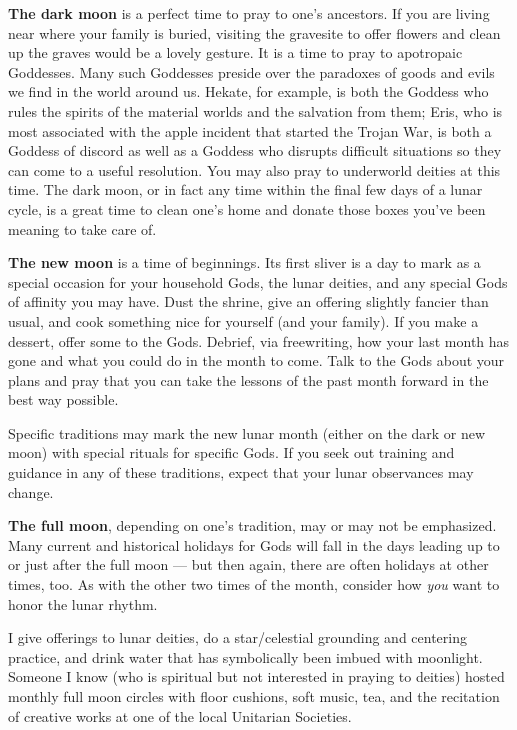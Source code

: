 \documentclass[
]{book}
\begin{document}
\textbf{The dark moon} is a perfect time to pray to one's ancestors. If you are living near where your family is buried, visiting the gravesite to offer flowers and clean up the graves would be a lovely gesture. It is a time to pray to apotropaic Goddesses. Many such Goddesses preside over the paradoxes of goods and evils we find in the world around us. Hekate, for example, is both the Goddess who rules the spirits of the material worlds and the salvation from them; Eris, who is most associated with the apple incident that started the Trojan War, is both a Goddess of discord as well as a Goddess who disrupts difficult situations so they can come to a useful resolution. You may also pray to underworld deities at this time. The dark moon, or in fact any time within the final few days of a lunar cycle, is a great time to clean one's home and donate those boxes you've been meaning to take care of.

\textbf{The new moon} is a time of beginnings. Its first sliver is a day to mark as a special occasion for your household Gods, the lunar deities, and any special Gods of affinity you may have. Dust the shrine, give an offering slightly fancier than usual, and cook something nice for yourself (and your family). If you make a dessert, offer some to the Gods. Debrief, via freewriting, how your last month has gone and what you could do in the month to come. Talk to the Gods about your plans and pray that you can take the lessons of the past month forward in the best way possible.

Specific traditions may mark the new lunar month (either on the dark or new moon) with special rituals for specific Gods. If you seek out training and guidance in any of these traditions, expect that your lunar observances may change.

\textbf{The full moon}, depending on one's tradition, may or may not be emphasized. Many current and historical holidays for Gods will fall in the days leading up to or just after the full moon --- but then again, there are often holidays at other times, too. As with the other two times of the month, consider how \emph{you} want to honor the lunar rhythm.

I give offerings to lunar deities, do a star/celestial grounding and centering practice, and drink water that has symbolically been imbued with moonlight. Someone I know (who is spiritual but not interested in praying to deities) hosted monthly full moon circles with floor cushions, soft music, tea, and the recitation of creative works at one of the local Unitarian Societies.
\end{document}

